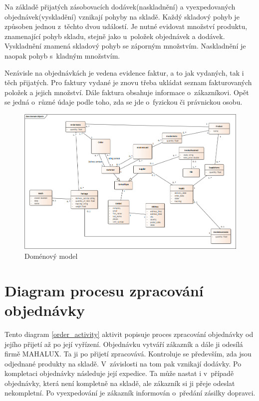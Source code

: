 \documentclass[thesis=B,czech]{FITthesis}[2012/06/26]
\begin{document}
	Na základě přijatých zásobovacích dodávek(naskladnění) a vyexpedovaných objednávek(vyskladění) vznikají pohyby na skladě. Každý skladový pohyb je způsoben jednou z~těchto dvou událostí. Je nutné evidovat množství produktu, znamenající pohyb skladu, stejně jako u~položek objednávek a dodávek. Vyskladnění znamená skladový pohyb se záporným množstvím. Naskladnění je naopak pohyb s~kladným množstvím.
	
	Nezávisle na objednávkách je vedena evidence faktur, a to jak vydaných, tak i těch přijatých. Pro faktury vydané je znovu třeba ukládat seznam fakturovaných položek a jejich množství. Dále faktura obsahuje informace o~zákazníkovi. Opět se jedná o~různé údaje podle toho, zda se jde o~fyzickou či právnickou osobu. 
	
\begin{figure}
	\includegraphics[height=\textwidth, angle=90]{domain_model.png}
	\caption{Doménový model}\label{domain_model}
\end{figure}

\section{Diagram procesu zpracování objednávky}
	Tento diagram \ref{order_activity} aktivit popisuje proces zpracování objednávky od jejího přijetí až po její vyřízení. Objednávku vytváří zákazník a dále ji odesílá firmě MAHALUX. Ta ji po přijetí zpracovává. Kontroluje se především, zda jsou odjednané produkty na skladě. V~závislosti na tom pak vznikají dodávky. Po kompletaci objednávky následuje její expedice. Ta může nastat i v~případě objednávky, která není kompletně na skladě, ale zákazník si ji přeje odeslat nekompletní. Po vyexpedování je zákazník informován o~předání zásilky dopravci.
\end{document}

